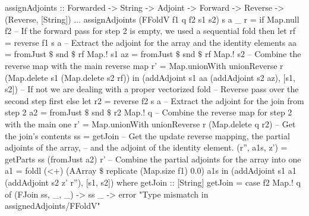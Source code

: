             \begin{haskell}[caption=Reverse pass over a vectorized fold, label=lst:assign_foldv, gobble=16]
                assignAdjoints :: Forwarded -> String -> Adjoint -> Forward -> Reverse
                    -> (Reverse, [String])
                $\dots$
                assignAdjoints (FFoldV f1 q f2 s1 s2) s a _ r =
                    if   Map.null f2
                    -- If the forward pass for step 2 is empty, we used a sequential fold
                    then let rf = reverse f1 s a
                             -- Extract the adjoint for the array and the identity elements
                             aa = fromJust $\$$ snd $\$$ rf Map.! s1
                             az = fromJust $\$$ snd $\$$ rf Map.! s2
                             -- Combine the reverse map with the main reverse map
                             r' = Map.unionWith unionReverse r 
                                (Map.delete s1 (Map.delete s2 rf))
                         in  (addAdjoint s1 aa (addAdjoint s2 az), [s1, s2])
                    -- If not we are dealing with a proper vectorized fold
                             -- Reverse pass over the second step first
                    else let r2 = reverse f2 s a
                             -- Extract the adjoint for the join from step 2
                             a2 = fromJust $\$$ snd $\$$ r2 Map.! q
                             -- Combine the reverse map for step 2 with the main one
                             r' = Map.unionWith unionReverse r (Map.delete q r2)
                             -- Get the join's contents
                             ss = getJoin
                             -- Get the update reverse mapping, the partial adjoints of the array,
                             -- and the adjoint of the identity element.
                             (r'', a1s, z') = getParts ss (fromJust a2) r'
                             -- Combine the partial adjoints for the array into one
                             a1 = foldl (<+) (AArray $\$$ replicate (Map.size f1) 0.0) a1s
                         in  (addAdjoint s1 a1 (addAdjoint s2 z' r''), [s1, s2])
                    where
                        getJoin :: [String]
                        getJoin = case f2 Map.! q of
                            (FJoin ss, _, _) -> ss
                            _                -> error "Type mismatch in assignedAdjoints/FFoldV"
                        

\end{haskell}
